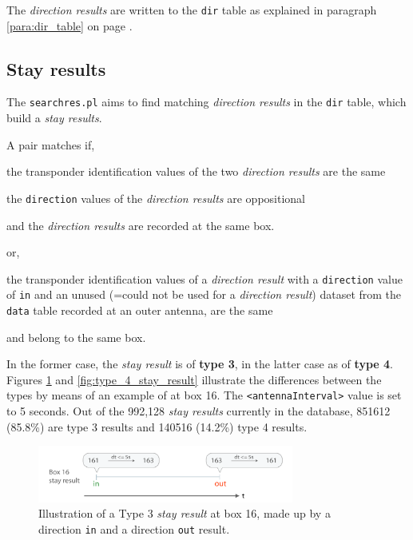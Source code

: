 The \textit{direction results} are written to the \lstinline|dir| table as explained in paragraph \ref{para:dir_table} on page \pageref{para:dir_table}. 

\subsection{Stay results}
\label{subsec:stayres}

The \lstinline|searchres.pl| aims to find matching \textit{direction results} in the \lstinline|dir| table, which build a \textit{stay results}.

A pair matches if,

\begin{mylist}
\item the transponder identification values of the two \textit{direction results} are the same
\item the \lstinline|direction| values of the \textit{direction results} are oppositional
\item and the \textit{direction results} are recorded at the same box.
\end{mylist}

or,

\begin{mylist}
\item the transponder identification values of a \textit{direction result} with a \lstinline|direction| value of \lstinline|in| and an unused (=could not be used for a \textit{direction result}) dataset from the \lstinline|data| table recorded at an outer antenna, are the same
\item and belong to the same box.
\end{mylist}

In the former case, the \textit{stay result} is of \textbf{type 3}, in the latter case as of \textbf{type 4}. Figures \ref{fig:type_3_stay_result} and \ref{fig:type_4_stay_result} illustrate the differences between the types by means of an example of at box 16. The \lstinline|<antennaInterval>| value is set to 5 seconds. Out of the 992,128 \textit{stay results} currently in the database, 851612 (85.8\%) are type 3 results and 140516 (14.2\%) type 4 results.

\begin{figure}[htpb]
\begin{center}
  \includegraphics[width=0.75\textwidth]{assets/pdf/stay_result_type_3_schema.pdf}
  \caption[Illustration of a type 3 \textit{stay result}]{Illustration of a Type 3 \textit{stay result} at box 16,  made up by a direction \lstinline|in| and a direction \lstinline|out| result.}
  \label{fig:type_3_stay_result}
\end{center}
\end{figure}

